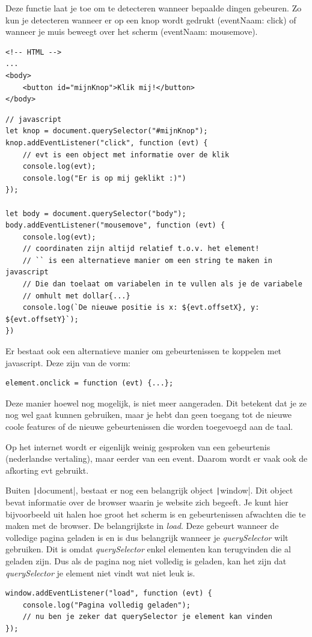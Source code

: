 Deze functie laat je toe om te detecteren wanneer bepaalde dingen gebeuren. 
Zo kun je detecteren wanneer er op een knop wordt gedrukt (eventNaam: click) of
wanneer je muis beweegt over het scherm (eventNaam: mousemove).
\begin{verbatim}
<!-- HTML -->
...
<body>
    <button id="mijnKnop">Klik mij!</button>
</body>
\end{verbatim}
\begin{verbatim}
// javascript
let knop = document.querySelector("#mijnKnop");
knop.addEventListener("click", function (evt) {
    // evt is een object met informatie over de klik
    console.log(evt); 
    console.log("Er is op mij geklikt :)")
});

let body = document.querySelector("body");
body.addEventListener("mousemove", function (evt) {
    console.log(evt);
    // coordinaten zijn altijd relatief t.o.v. het element!
    // `` is een alternatieve manier om een string te maken in javascript
    // Die dan toelaat om variabelen in te vullen als je de variabele
    // omhult met dollar{...}
    console.log(`De nieuwe positie is x: ${evt.offsetX}, y: ${evt.offsetY}`);
})
\end{verbatim}

\Opm Er bestaat ook een alternatieve manier om gebeurtenissen te koppelen met
javascript. Deze zijn van de vorm:
\begin{verbatim}
element.onclick = function (evt) {...};
\end{verbatim}
Deze manier hoewel nog mogelijk, is niet meer aangeraden. Dit betekent dat je
ze nog wel gaat kunnen gebruiken, maar je hebt dan geen toegang tot de nieuwe
coole features of de nieuwe gebeurtenissen die worden toegevoegd aan de taal.

\Opm Op het internet wordt er eigenlijk weinig gesproken van een gebeurtenis
(nederlandse vertaling), maar eerder van een event. Daarom wordt er vaak ook
de afkorting evt gebruikt.

Buiten \texttt|document|, bestaat er nog een belangrijk object 
\texttt|window|. Dit object bevat informatie over de browser
waarin je website zich begeeft. Je kunt hier bijvoorbeeld uit halen hoe groot
het scherm is en gebeurtenissen afwachten die te maken met de browser. De 
belangrijkste in \emph{load}. Deze gebeurt wanneer de volledige pagina geladen
is en is dus belangrijk wanneer je \emph{querySelector} wilt gebruiken. Dit is
omdat \emph{querySelector} enkel elementen kan terugvinden die al geladen zijn.
Dus als de pagina nog niet volledig is geladen, kan het zijn dat
\emph{querySelector} je element niet vindt wat niet leuk is.
\begin{verbatim}
window.addEventListener("load", function (evt) {
    console.log("Pagina volledig geladen");
    // nu ben je zeker dat querySelector je element kan vinden
});
\end{verbatim}

